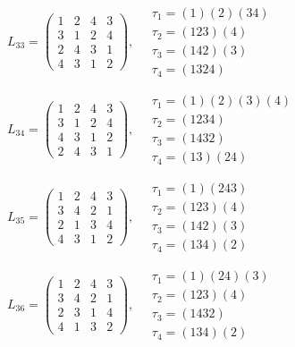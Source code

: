 $L_{33} = \begin{pmatrix} 1 & 2 & 4 & 3 \\ 3 & 1 & 2 & 4 \\ 2 & 4 & 3 & 1 \\ 4 & 3 & 1 & 2 \end{pmatrix}, \quad \begin{matrix} \tau_{1} = (1)(2)(3 4) \\ \tau_{2} = (1 2 3)(4) \\ \tau_{3} = (1 4 2)(3) \\ \tau_{4} = (1 3 2 4) \end{matrix}$

$L_{34} = \begin{pmatrix} 1 & 2 & 4 & 3 \\ 3 & 1 & 2 & 4 \\ 4 & 3 & 1 & 2 \\ 2 & 4 & 3 & 1 \end{pmatrix}, \quad \begin{matrix} \tau_{1} = (1)(2)(3)(4) \\ \tau_{2} = (1 2 3 4) \\ \tau_{3} = (1 4 3 2) \\ \tau_{4} = (1 3)(2 4) \end{matrix}$

$L_{35} = \begin{pmatrix} 1 & 2 & 4 & 3 \\ 3 & 4 & 2 & 1 \\ 2 & 1 & 3 & 4 \\ 4 & 3 & 1 & 2 \end{pmatrix}, \quad \begin{matrix} \tau_{1} = (1)(2 4 3) \\ \tau_{2} = (1 2 3)(4) \\ \tau_{3} = (1 4 2)(3) \\ \tau_{4} = (1 3 4)(2) \end{matrix}$

$L_{36} = \begin{pmatrix} 1 & 2 & 4 & 3 \\ 3 & 4 & 2 & 1 \\ 2 & 3 & 1 & 4 \\ 4 & 1 & 3 & 2 \end{pmatrix}, \quad \begin{matrix} \tau_{1} = (1)(2 4)(3) \\ \tau_{2} = (1 2 3)(4) \\ \tau_{3} = (1 4 3 2) \\ \tau_{4} = (1 3 4)(2) \end{matrix}$


